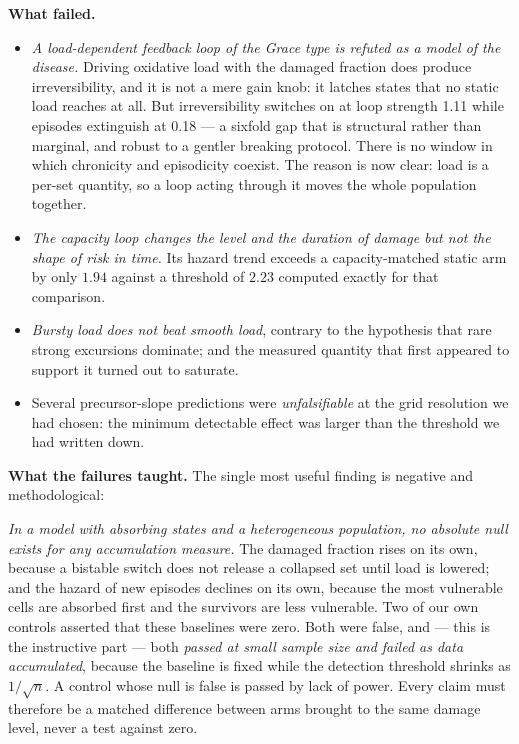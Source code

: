 \documentclass[11pt,a4paper]{article}
\begin{document}
\vspace{2pt}
\noindent\textbf{What failed.}
\begin{itemize}
\item \emph{A load-dependent feedback loop of the Grace type is refuted as a model of the
disease.} Driving oxidative load with the damaged fraction does produce irreversibility, and it is
not a mere gain knob: it latches states that no static load reaches at all. But irreversibility
switches on at loop strength 1.11 while episodes extinguish at 0.18 --- a sixfold gap that is
structural rather than marginal, and robust to a gentler breaking protocol. There is no window in
which chronicity and episodicity coexist. The reason is now clear: load is a per-set quantity, so a
loop acting through it moves the whole population together.
\item \emph{The capacity loop changes the level and the duration of damage but not the shape of
risk in time.} Its hazard trend exceeds a capacity-matched static arm by only $1.94$ against a
threshold of $2.23$ computed exactly for that comparison.
\item \emph{Bursty load does not beat smooth load}, contrary to the hypothesis that rare strong
excursions dominate; and the measured quantity that first appeared to support it turned out to
saturate.
\item Several precursor-slope predictions were \emph{unfalsifiable} at the grid resolution we had
chosen: the minimum detectable effect was larger than the threshold we had written down.
\end{itemize}

\vspace{2pt}
\noindent\textbf{What the failures taught.} The single most useful finding
is negative and methodological:

\emph{In a model with absorbing states and a heterogeneous population, no absolute null exists for
any accumulation measure.} The damaged fraction rises on its own, because a bistable switch does
not release a collapsed set until load is lowered; and the hazard of new episodes declines on its
own, because the most vulnerable cells are absorbed first and the survivors are less vulnerable.
Two of our own controls asserted that these baselines were zero. Both were false, and --- this is
the instructive part --- both \emph{passed at small sample size and failed as data accumulated},
because the baseline is fixed while the detection threshold shrinks as $1/\sqrt{n}$. A control whose
null is false is passed by lack of power. Every claim must therefore be a matched difference
between arms brought to the same damage level, never a test against zero.
\end{document}

